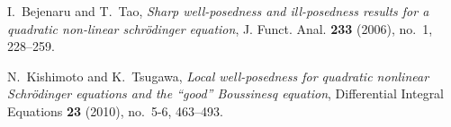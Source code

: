 \documentclass[12pt,reqno]{amsart}
\numberwithin{equation}{section}  %
\begin{document}
%
%
%
%
%
\begin{thebibliography}{KT10}

I.~Bejenaru and T.~Tao, \emph{Sharp well-posedness and ill-posedness results
  for a quadratic non-linear schr{\"o}dinger equation}, J. Funct. Anal.
  \textbf{233} (2006), no.~1, 228--259.

N.~Kishimoto and K.~Tsugawa, \emph{Local well-posedness for quadratic nonlinear
  {S}chr{\"o}dinger equations and the ``good'' {B}oussinesq equation},
  Differential Integral Equations \textbf{23} (2010), no.~5-6, 463--493.

\end{thebibliography}
%
%
%
%
%
%
%
\end{document}
